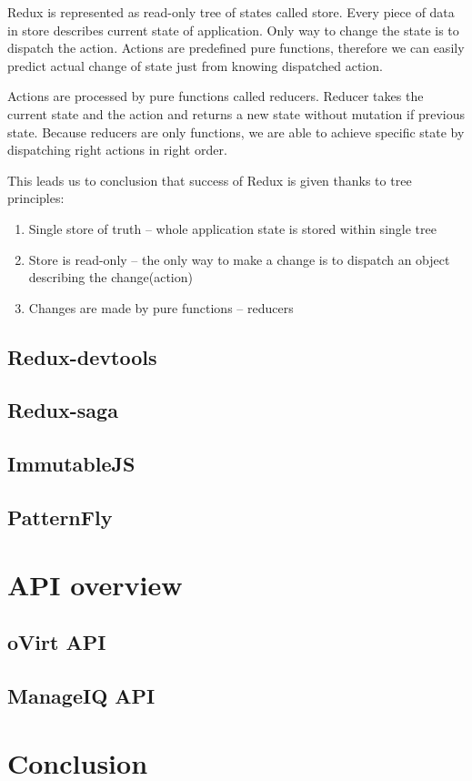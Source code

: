Redux is represented as read-only tree of states called store. Every piece of data in store describes current state of application. Only way to change the state is to dispatch the action. Actions are predefined pure functions, therefore we can easily predict actual change of state just from knowing dispatched action.

Actions are processed by pure functions called reducers. Reducer takes the current state and the action and returns a new state without mutation if previous state. Because reducers are only functions, we are able to achieve specific state by dispatching right actions in right order.

This leads us to conclusion that success of Redux is given thanks to tree principles:
\begin{enumerate}
\item Single store of truth -- whole application state is stored within single tree
\item Store is read-only -- the only way to make a change is to dispatch an object describing the change(action)
\item Changes are made by pure functions -- reducers 
\end{enumerate}

\section{Redux-devtools}
\section{Redux-saga}
\section{ImmutableJS}
\section{PatternFly}

\chapter{API overview}

\section{oVirt API}
\section{ManageIQ API}







\chapter{Conclusion}

